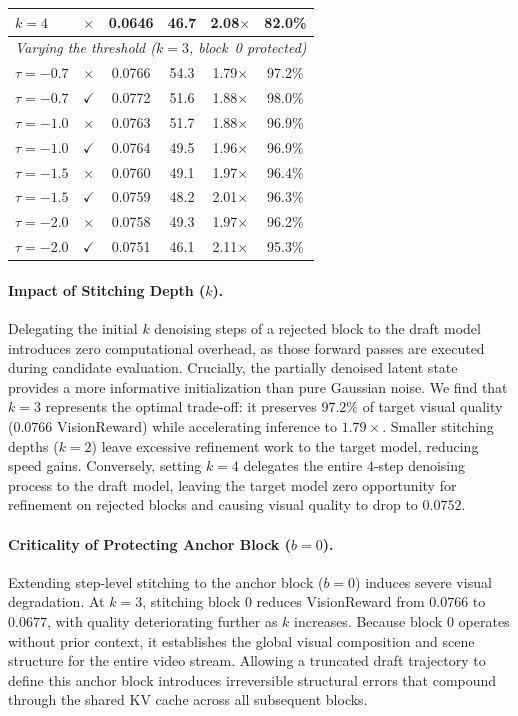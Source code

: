 \documentclass{article} %
\begin{document}
\begin{table}[t]
\begin{tabular}{lccccc}
    $k{=}4$ & $\times$ & 0.0646 & 46.7 & 2.08$\times$ & 82.0\% \\
    \midrule
    \multicolumn{6}{l}{\textit{Varying the threshold ($k{=}3$, block~0 protected)}} \\
    $\tau{=}{-}0.7$ & $\times$ & 0.0766 & 54.3 & 1.79$\times$ & 97.2\% \\
    $\tau{=}{-}0.7$ & $\checkmark$ & 0.0772 & 51.6 & 1.88$\times$ & 98.0\% \\
    $\tau{=}{-}1.0$ & $\times$ & 0.0763 & 51.7 & 1.88$\times$ & 96.9\% \\
    $\tau{=}{-}1.0$ & $\checkmark$ & 0.0764 & 49.5 & 1.96$\times$ & 96.9\% \\
    $\tau{=}{-}1.5$ & $\times$ & 0.0760 & 49.1 & 1.97$\times$ & 96.4\% \\
    $\tau{=}{-}1.5$ & $\checkmark$ & 0.0759 & 48.2 & 2.01$\times$ & 96.3\% \\
    $\tau{=}{-}2.0$ & $\times$ & 0.0758 & 49.3 & 1.97$\times$ & 96.2\% \\
    $\tau{=}{-}2.0$ & $\checkmark$ & 0.0751 & 46.1 & 2.11$\times$ & 95.3\% \\
    \bottomrule
  \end{tabular}
\end{table}

\paragraph{Impact of Stitching Depth ($k$).}
Delegating the initial $k$ denoising steps of a rejected block to the draft model introduces zero computational overhead, as those forward passes are executed during candidate evaluation. Crucially, the partially denoised latent state provides a more informative initialization than pure Gaussian noise. We find that $k=3$ represents the optimal trade-off: it preserves $97.2\%$ of target visual quality ($0.0766$ VisionReward) while accelerating inference to $1.79\times$. Smaller stitching depths ($k=2$) leave excessive refinement work to the target model, reducing speed gains. Conversely, setting $k=4$ delegates the entire $4$-step denoising process to the draft model, leaving the target model zero opportunity for refinement on rejected blocks and causing visual quality to drop to $0.0752$.

\paragraph{Criticality of Protecting Anchor Block ($b=0$).}
Extending step-level stitching to the anchor block ($b=0$) induces severe visual degradation. At $k=3$, stitching block $0$ reduces VisionReward from $0.0766$ to $0.0677$, with quality deteriorating further as $k$ increases. Because block $0$ operates without prior context, it establishes the global visual composition and scene structure for the entire video stream. Allowing a truncated draft trajectory to define this anchor block introduces irreversible structural errors that compound through the shared KV cache across all subsequent blocks.
\end{document}
